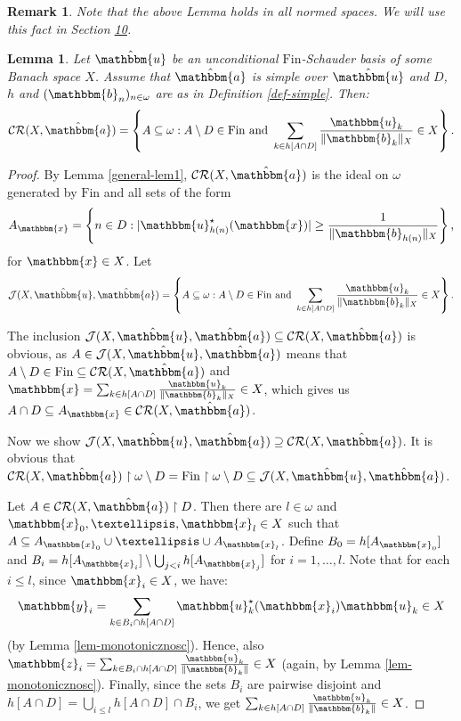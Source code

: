 \documentclass[10pt,a4paper]{amsart}
\newcommand{\J}{\mathcal{J}}
\newcommand{\Fin}{\mathrm{Fin}}
\newcommand{\CR}{\mathcal{CR}}
\newcommand{\w}{\mathbbm}
\newtheorem{lemma}[theorem]{Lemma}
\newtheorem{remark}[theorem]{Remark}
\begin{document}
\begin{remark}
\label{remark-general-lem1}
Note that the above Lemma holds in all normed spaces. We will use this fact in Section \href{https://arxiv.org/abs/2508.21235v1}{10}.
\end{remark}

\begin{lemma}
\label{general-lem2}
Let $\hat{\w{u}}$ be an unconditional $\Fin$-Schauder basis of some Banach space $X$. Assume that $\hat{\w{a}}$ is simple over $\hat{\w{u}}$ and $D$, $h$ and $(\w{b}_n)_{n\in\omega}$ are as in Definition \ref{def-simple}. Then:
\[
\CR(X,\hat{\w{a}})=\left\{A\subseteq\omega: A\setminus D\in\Fin\text{ and }\sum_{k\in h[A\cap D]}\frac{\w{u}_{k}}{\|\w{b}_{k}\|_X}\in X\right\}.
\]
\end{lemma}

\begin{proof}
By Lemma \ref{general-lem1}, $\CR(X,\hat{\w{a}})$ is the ideal on $\omega$ generated by $\Fin$ and all sets of the form
    \[
    A_{\w{x}}=\left\{n\in D: |\w{u}^\star_{h(n)}(\w{x})|\geq\frac{1}{\|\w{b}_{h(n)}\|_X}\right\},
    \]
for $\w{x}\in X$. Let 
\[
\J(X,\hat{\w{u}},\hat{\w{a}})=\left\{A\subseteq\omega: A\setminus D\in\Fin\text{ and }\sum_{k\in h[A\cap D]}\frac{\w{u}_{k}}{\|\w{b}_{k}\|_X}\in X\right\}.
\]

The inclusion $\J(X,\hat{\w{u}},\hat{\w{a}})\subseteq\CR(X,\hat{\w{a}})$ is obvious, as $A\in \J(X,\hat{\w{u}},\hat{\w{a}})$ means that $A\setminus D\in\Fin\subseteq\CR(X,\hat{\w{a}})$ and $\w{x}=\sum_{k\in h[A\cap D]}\frac{\w{u}_{k}}{\|\w{b}_{k}\|_X}\in X$, which gives us $A\cap D\subseteq A_{\w{x}}\in \CR(X,\hat{\w{a}})$.

Now we show $\J(X,\hat{\w{u}},\hat{\w{a}})\supseteq\CR(X,\hat{\w{a}})$. It is obvious that $\CR(X,\hat{\w{a}})\restriction\omega\setminus D=\Fin\restriction\omega\setminus D\subseteq \J(X,\hat{\w{u}},\hat{\w{a}})$. 

Let $A\in \CR(X,\hat{\w{a}})\restriction D$. Then there are $l\in\omega$ and $\w{x}_0,\ldots,\w{x}_l\in X$ such that $A\subseteq A_{\w{x}_0}\cup\ldots\cup A_{\w{x}_l}$. Define $B_0=h[A_{\w{x}_0}]$ and $B_i=h[A_{\w{x}_i}]\setminus\bigcup_{j<i}h[A_{\w{x}_j}]$ for $i=1,\ldots,l$. Note that for each $i\leq l$, since $\w{x}_i\in X$, we have:
\[
\w{y}_i=\sum_{k\in B_i\cap h[A\cap D]}\w{u}_{k}^\star(\w{x}_i)\w{u}_{k}\in X
\]
(by Lemma \ref{lem-monotonicznosc}). Hence, also $\w{z}_i=\sum_{k\in B_i\cap h[A\cap D]}\frac{\w{u}_{k}}{\|\w{b}_{k}\|}\in X$ (again, by Lemma \ref{lem-monotonicznosc}). Finally, since the sets $B_i$ are pairwise disjoint and $h[A\cap D]=\bigcup_{i\leq l}h[A\cap D]\cap B_i$, we get $\sum_{k\in h[A\cap D]}\frac{\w{u}_{k}}{\|\w{b}_{k}\|}\in X$.
\end{proof}
\end{document}

